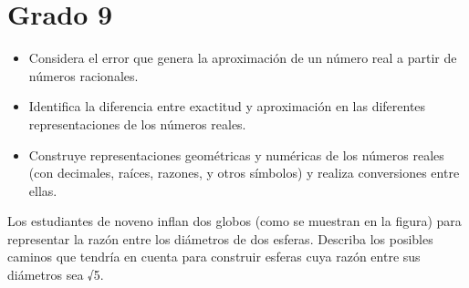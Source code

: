 \section{Grado 9}\label{grado:9}


\evidencias

\begin{itemize}
  \item Considera el error que genera la aproximación de un número real a partir de números racionales.
  \item Identifica la diferencia entre exactitud y aproximación en las diferentes representaciones de los números reales.
  \item Construye representaciones geométricas y numéricas de los números reales (con decimales, raíces, razones, y otros símbolos) y realiza conversiones entre ellas.
\end{itemize}

\ejemplo

Los estudiantes de noveno inflan dos globos (como se muestran en la figura) para representar la razón entre los diámetros de dos esferas. Describa los posibles caminos que tendría en cuenta para construir esferas cuya razón entre sus diámetros sea √5.


